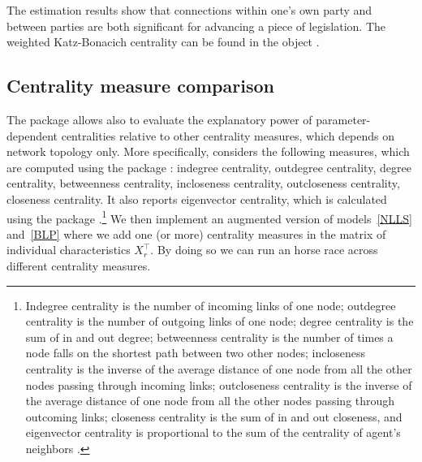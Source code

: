\documentclass[nojss]{jss}
\begin{document}
The estimation results show that connections within one's own party and between parties are both significant for advancing a piece of legislation. The weighted Katz-Bonacich centrality can be found in the object .

\subsection{Centrality measure comparison}

The  package  allows also to evaluate the explanatory power of parameter-dependent centralities relative to other centrality measures, which depends on network topology only. More specifically,  considers the following measures, which are computed using the  package  \citep{igraph}: indegree centrality, outdegree centrality, degree centrality, betweenness centrality, incloseness centrality, outcloseness centrality, closeness centrality. It also reports eigenvector centrality, which is calculated using the  package  \citep{sna}.\footnote{Indegree centrality is the number of incoming links of one node; outdegree centrality is the number of outgoing links of one node; degree centrality is the sum of in and out degree; betweenness centrality is the number of times a node falls on the shortest path between two other nodes; incloseness centrality is the inverse of the average distance of one node from all the other nodes passing through incoming links; outcloseness centrality is the inverse of the average distance of one node from all the other nodes passing through outcoming links; closeness centrality is the sum of in and out closeness, and eigenvector centrality is proportional to the sum of the centrality of agent's neighbors \cite[see][for further details]{Jackson:2010}.}
We then implement an augmented version of models~\ref{NLLS} and~\ref{BLP} where we add one (or more) centrality measures in the matrix of individual characteristics $X_{r}^\top.$ By doing so we can run an horse race across different centrality measures.
\end{document}
